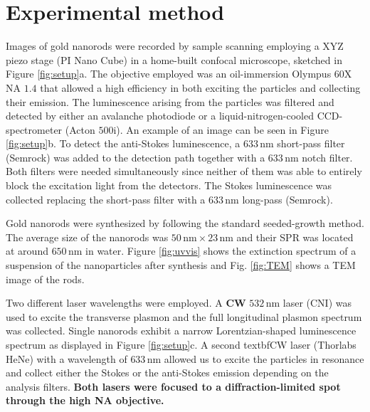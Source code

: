 \documentclass[journal=nalefd,manuscript=letter]{achemso}
\newcommand{\nm}{\ensuremath{\,\textrm{nm}}}
\begin{document}
\section{Experimental method}
Images of gold nanorods were recorded by sample scanning employing a XYZ piezo
stage (PI Nano Cube) in a  home-built confocal microscope, sketched in Figure
\ref{fig:setup}a. The objective employed was an oil-immersion Olympus 60X NA
$1.4$ that allowed a high efficiency in both exciting the particles and
collecting their emission. The luminescence arising from the particles was
filtered and detected by either an avalanche photodiode or a
liquid-nitrogen-cooled CCD-spectrometer (Acton $500\textrm{i}$). An example of
an image can be seen in Figure \ref{fig:setup}b. To detect the anti-Stokes
luminescence, a $633\nm$ short-pass filter (Semrock) was added to the detection
path together with a $633\nm$ notch filter. Both filters were needed
simultaneously since neither of them was able to entirely block the excitation
light from the detectors. The Stokes luminescence was collected replacing the
short-pass filter with a $633\nm$ long-pass (Semrock).

Gold nanorods were synthesized by following the standard seeded-growth
method\cite{Nikoobakht2003}. The average size of the nanorods was $50\nm\times
23\nm$ and their SPR was located at around $650\nm$ in water. Figure
\ref{fig:uvvis} shows the extinction spectrum of a suspension of the
nanoparticles after synthesis and Fig. \ref{fig:TEM} shows a TEM image of the
rods.

Two different laser wavelengths were employed. A \textbf{CW} $532\nm$ laser
(CNI) was used to excite the transverse plasmon and the full longitudinal
plasmon spectrum was collected. Single nanorods exhibit a narrow
Lorentzian-shaped luminescence spectrum as displayed in Figure \ref{fig:setup}c.
A second textbf{CW} laser (Thorlabs HeNe) with a wavelength of $633\nm$ allowed
us to excite the particles in resonance and collect either the Stokes or the
anti-Stokes emission depending on the analysis filters. \textbf{Both lasers
were focused to a diffraction-limited spot through the high NA objective.}
\end{document}
